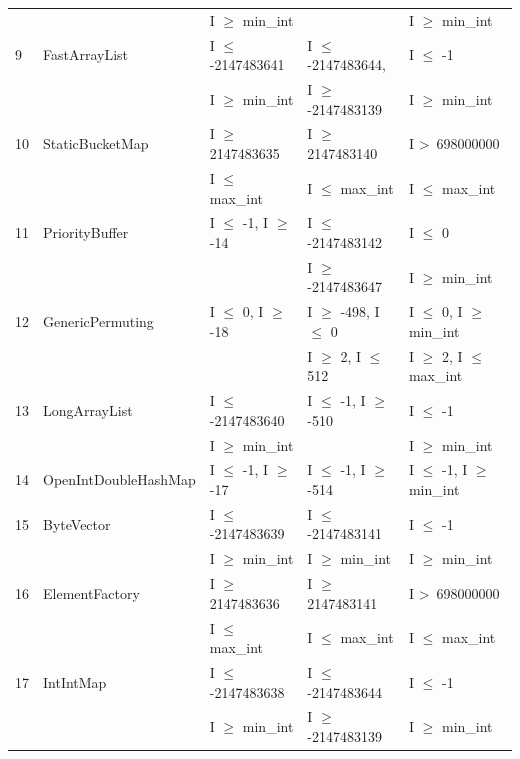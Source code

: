 \documentclass[runningheads,a4paper]{llncs}
\begin{document}
{\begin{longtable}{|l|l|l|l|l|}
	&                                             & I $\ge$ min\_int					& 								& I $\ge$ min\_int				\\	
9	& FastArrayList				& I $\le$ -2147483641 			& I $\le$ -2147483644, 			& I $\le$ -1								\\ 
	&                                             & I $\ge$ min\_int					& I $\ge$ -2147483139			& I $\ge$ min\_int				\\	
10	& StaticBucketMap			& I $\ge$ 2147483635			& I $\ge$ 2147483140			& I \textgreater~698000000					\\ 
	&                                             & I $\le$ max\_int					& I $\le$ max\_int					& I $\le$ max\_int			   		\\	
11	& PriorityBuffer				& I $\le$ -1, I $\ge$ -14			& I $\le$  -2147483142			& I $\le$ 0								\\
	&                                             & 								& I $\ge$ -2147483647			& I $\ge$ min\_int			   	\\	 
12	& GenericPermuting			& I $\le$ 0, I $\ge$ -18			& I $\ge$ -498, I $\le$ 0			& I $\le$ 0, I $\ge$ min\_int	\\ 	%
	&                                             & 								& I $\ge$ 2, I $\le$ 512			& I $\ge$ 2, I $\le$ max\_int	\\
13	& LongArrayList				& I $\le$ -2147483640			& I $\le$ -1, I $\ge$ -510			& I $\le$ -1								\\ 
	&                                             & I $\ge$ min\_int					& 								& I $\ge$ min\_int				\\
14	& OpenIntDoubleHashMap	& I $\le$ -1, I $\ge$ -17			& I $\le$ -1, I $\ge$ -514			& I $\le$ -1, I $\ge$ min\_int	\\ 
15	& ByteVector					& I $\le$ -2147483639			& I $\le$ -2147483141			& I $\le$ -1								\\ 	%
	&                                             & I $\ge$ min\_int					& I $\ge$ min\_int				& I $\ge$ min\_int				\\	
16	& ElementFactory				& I $\ge$ 2147483636			& I $\ge$ 2147483141			& I \textgreater~698000000					\\ 
	&                                             & I $\le$ max\_int					& I $\le$ max\_int					& I $\le$ max\_int						\\	
17	& IntIntMap					& I $\le$ -2147483638			& I $\le$ -2147483644			& I $\le$ -1								\\ 
	&                                             & I $\ge$ min\_int					& I $\ge$ -2147483139			& I $\ge$ min\_int 				\\	

\end{longtable}}
\end{document}
